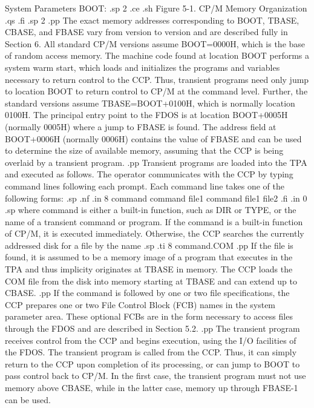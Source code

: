                             System Parameters
                  BOOT:
.sp 2
.ce
.sh
Figure 5-1.  CP/M Memory Organization
.qs
.fi
.sp 2
.pp
The exact memory addresses corresponding to BOOT, TBASE, CBASE, and FBASE 
vary from version to version and are described fully in Section 6.  All 
standard CP/M versions assume BOOT=0000H, which is the base of 
random access memory.  The machine code found at location BOOT performs a 
system warm start, which loads and initializes the programs and variables 
necessary to return control to the CCP.  Thus, transient programs need only 
jump to location BOOT to return control to CP/M at the command level.  
Further, the standard versions assume TBASE=BOOT+0100H, which is normally 
location 0100H.  The principal entry point to the FDOS is at location 
BOOT+0005H (normally 0005H) where a jump to FBASE is found.  The address 
field at BOOT+0006H (normally 0006H) contains the value of FBASE and can be 
used to determine the size of available memory, assuming that the CCP is 
being overlaid by a transient program.
.pp  
Transient programs are loaded into the TPA and executed as follows.  The 
operator communicates with the CCP by typing command lines following each 
prompt.  Each command line takes one of the following forms:
.sp 
.nf
.in 8
command
command file1
command file1 file2
.fi
.in 0
.sp 
where command is either a built-in function, such as DIR or TYPE, or the name 
of a transient command or program.  If the command is a built-in function of 
CP/M, it is executed immediately.  Otherwise, the CCP searches the currently 
addressed disk for a file by the name
.sp 
.ti 8
command.COM
.pp
If the file is found, it is assumed to be a memory image of a program that 
executes in the TPA and thus implicity originates at TBASE in memory.  The 
CCP loads the COM file from the disk into memory starting at TBASE and can 
extend up to CBASE.
.pp
If the command is followed by one or two file specifications, the CCP prepares 
one or two File Control Block (FCB) names in the system 
parameter area.  These optional FCBs are in the form necessary to 
access files through the FDOS and are described in Section 5.2.
.pp
The transient program receives control from the CCP and begins 
execution, using the I/O facilities of the FDOS.  The transient 
program is called from the CCP.  Thus, it can simply return to the CCP upon 
completion of its processing, or can jump to BOOT to pass control back to 
CP/M.  In the first case, the transient program must not use memory above 
CBASE, while in the latter case, memory up through FBASE-1 can be used.
